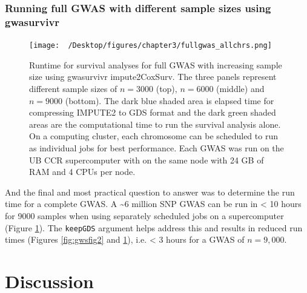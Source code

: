 \documentclass[]{DissertateOSU}
\begin{document}
\subsubsection{Running full GWAS with different sample sizes using
gwasurvivr}\label{running-full-gwas-with-different-sample-sizes-using-gwasurvivr}

\begin{figure}
    \centering
    \texttt{[image: ~/Desktop/figures/chapter3/fullgwas\_allchrs.png]}
    \caption[Runtime for survival analyses for full GWAS with increasing sample size. ]{Runtime for survival analyses for full GWAS with increasing sample size using gwasurvivr impute2CoxSurv. The three panels represent different sample sizes of $n=3000$ (top), $n=6000$ (middle) and $n=9000$ (bottom). The dark blue shaded area is elapsed time for compressing IMPUTE2 to GDS format and the dark green shaded areas are the computational time to run the survival analysis alone. On a computing cluster, each chromosome can be scheduled to run as individual jobs for best performance. Each GWAS was run on the UB CCR supercomputer with on the same node with 24 GB of RAM and 4 CPUs per node.}
    \label{fig:gwsfig4}  
\end{figure}

And the final and most practical question to answer was to determine the
run time for a complete GWAS. A \textasciitilde{}6 million SNP GWAS can
be run in \textless{} 10 hours for 9000 samples when using separately
scheduled jobs on a supercomputer (Figure \ref{fig:gwsfig4}). The
\texttt{keepGDS} argument helps address this and results in reduced run
times (Figures \ref{fig:gwsfig2} and \ref{fig:gwsfig4}), i.e.
\textless{} 3 hours for a GWAS of \(n=9,000\).

\section{Discussion}\label{discussion-2}
\end{document}
